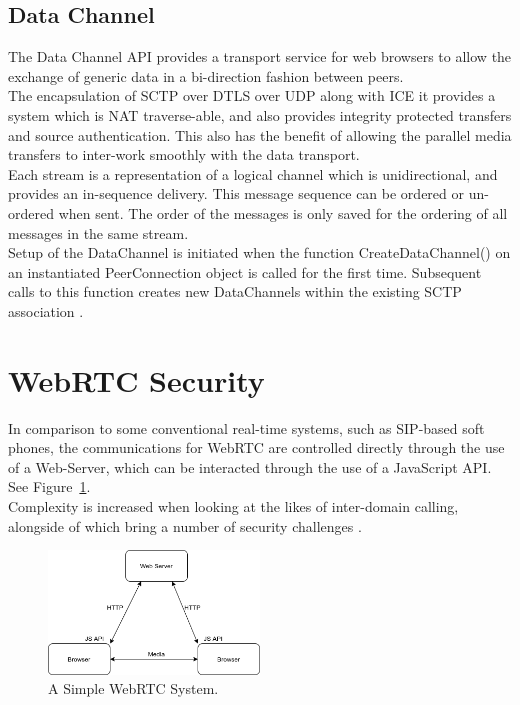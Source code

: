 \subsection{Data Channel}
The Data Channel API provides a transport service for web browsers to allow the exchange of generic data in a bi-direction fashion between peers.
\\ The encapsulation of SCTP over DTLS over UDP along with ICE it provides a system which is NAT traverse-able, and also provides integrity protected transfers and source authentication. This also has the benefit of allowing the parallel media transfers to inter-work smoothly with the data transport.
\\ Each stream is a representation of a logical channel which is unidirectional, and provides an in-sequence delivery. This message sequence can be ordered or un-ordered when sent. The order of the messages is only saved for the ordering of all messages in the same stream.
\\ Setup of the DataChannel is initiated when the function CreateDataChannel() on an instantiated PeerConnection object is called for the first time. Subsequent calls to this function creates new DataChannels within the existing SCTP association \cite{loreto2014real}.

\section{WebRTC Security}
In comparison to some conventional real-time systems, such as SIP-based soft phones, the communications for WebRTC are controlled directly through the use of a Web-Server, which can be interacted through the use of a JavaScript API. See Figure~\ref{image:simpleWebRTCSystem}.
\\Complexity is increased when looking at the likes of inter-domain calling, alongside of which bring a number of security challenges \cite{rescorla2013webrtc}.

\begin{figure}[h!]
    \caption{A Simple WebRTC System.}
    \label{image:simpleWebRTCSystem}
    \centering
    \includegraphics[width=0.5\textwidth]{images/simpleWebRTCSystem.png}
\end{figure}

